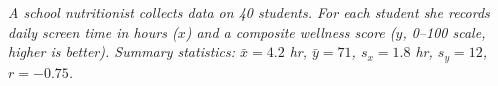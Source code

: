 \documentclass[10pt]{article}
\begin{document}
\namepartnerperiod

\vspace{0.12in}

\begin{tcolorbox}[colback=sky, colframe=navy, boxrule=0.9pt, arc=2mm,
    left=4mm, right=4mm, top=2.5mm, bottom=2.5mm]
\small\textit{A school nutritionist collects data on 40 students. For each student she records
daily screen time in hours ($x$) and a composite wellness score ($y$, 0--100 scale, higher is
better). Summary statistics: $\bar{x} = 4.2$ hr, $\bar{y} = 71$, $s_x = 1.8$ hr, $s_y = 12$,
$r = -0.75$.}
\end{tcolorbox}

\vspace{0.14in}

\end{document}
